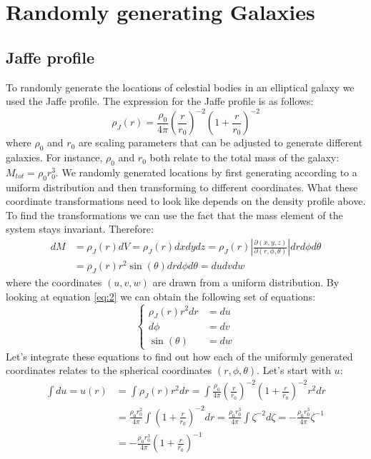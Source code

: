 \documentclass[]{article}
\title{}
\author{Marten Lourens (s3435040)}
\begin{document}
\maketitle

\section{Randomly generating Galaxies}
\subsection{Jaffe profile}
To randomly generate the locations of celestial bodies in an elliptical galaxy we used the Jaffe profile. The expression for the Jaffe profile is as follows:
\begin{equation}
	\rho_{J}(r) = \frac{\rho_0}{4\pi}\left(\frac{r}{r_0}\right)^{-2}\left(1+\frac{r}{r_0}\right)^{-2}
\end{equation}
where $\rho_0$ and $r_0$ are scaling parameters that can be adjusted to generate different galaxies. For instance, $\rho_0$ and $r_0$ both relate to the total mass of the galaxy: $M_{tot}=\rho_0 r_0^3$.
We randomly generated locations by first generating according to a uniform distribution and then transforming to different coordinates. What these coordinate transformations need to look like depends on the density profile above. To find the transformations we can use the fact that the mass element of the system stays invariant. Therefore:
\begin{align}
	dM &= \rho_J(r)dV = \rho_{J}(r)dxdydz = \rho_{J}(r)\left|\frac{\partial(x, y, z)}{\partial(r, \phi, \theta)}\right|drd\phi d\theta\nonumber\\
	&= \rho_{J}(r)r^2\sin(\theta)drd\phi d\theta = dudvdw\label{eq:2}
\end{align}
where the coordinates $(u, v, w)$ are drawn from a uniform distribution. By looking at equation \eqref{eq:2} we can obtain the following set of equations:
\begin{equation}
	\begin{cases}
		\rho_{J}(r)r^2dr &= du\\
		d\phi &= dv\\
		\sin(\theta) &= dw
	\end{cases}
\end{equation}
Let's integrate these equations to find out how each of the uniformly generated coordinates relates to the spherical coordinates $(r, \phi, \theta)$. Let's start with $u$:
\begin{align*}
	\int du = u(r) &= \int \rho_{J}(r)r^2dr = \int \frac{\rho_0}{4\pi}\left(\frac{r}{r_0}\right)^{-2}\left(1+\frac{r}{r_0}\right)^{-2}r^2dr\\
	&= \frac{\rho_0r_0^2}{4\pi}\int \left(1+\frac{r}{r_0}\right)^{-2} dr = \frac{\rho_0r_0^3}{4\pi}\int \zeta^{-2} d\zeta = -\frac{\rho_0r_0^3}{4\pi}\zeta^{-1}\\
	&= -\frac{\rho_0r_0^3}{4\pi}\left(1+\frac{r}{r_0}\right)^{-1}
\end{align*}
\end{document}
